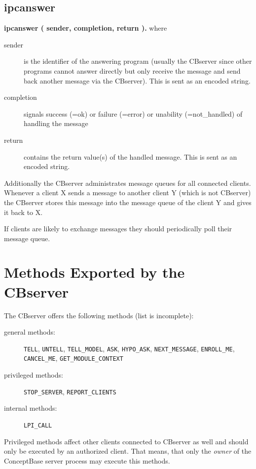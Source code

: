 \subsection{ipcanswer}

{\bf ipcanswer ( sender, completion, return ).} where

\begin{description}
\item[sender] is the identifier of the answering program (usually the
  CBserver since other programs cannot answer directly but only
  receive the message and send back another message via the CBserver).
  This is sent as an encoded string.
\item[completion] signals success (=ok) or failure (=error)
  or unability (=not\_handled) of handling the message
\item[return] contains the return value(s) of the handled message. This
  is sent as an encoded string.
\end{description}

Additionally the CBserver administrates message queues for all
connected clients. Whenever a client X sends a message to another
client Y (which is not CBserver) the CBserver stores this message into
the message queue of the client Y and gives it back to X.

 If clients are likely to exchange messages they should periodically
poll their message queue.

\section{Methods Exported by the CBserver}
\label{sec:methods}


The CBserver offers the following methods (list is incomplete):

\begin{description}
\item[general methods:] {\tt TELL}, {\tt UNTELL}, {\tt TELL\_MODEL},
  {\tt ASK}, {\tt HYPO\_ASK}, {\tt NEXT\_MESSAGE}, {\tt ENROLL\_ME}, {\tt CANCEL\_ME},
  {\tt GET\_MODULE\_CONTEXT}
\item[privileged methods:]  {\tt STOP\_SERVER}, {\tt REPORT\_CLIENTS}
\item [internal methods:] {\tt LPI\_CALL}
\end{description}

Privileged methods affect other clients connected to CBserver as well and should
only be executed by an authorized client. That means, that only the {\em owner}
of the ConceptBase server process may execute this methods.

